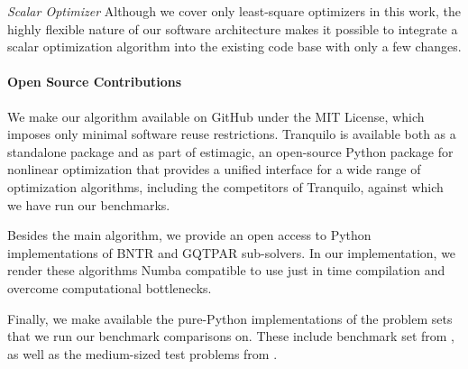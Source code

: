 \textit{Scalar Optimizer} Although we cover only least-square optimizers in this work, the highly flexible nature of our software architecture makes it possible to integrate a scalar optimization algorithm into the existing code base with only a few changes.

\paragraph{Open Source Contributions} We make our algorithm available on GitHub under the MIT License, which imposes only minimal software reuse restrictions. Tranquilo is available both as a standalone package and as part of estimagic, an open-source Python package for nonlinear optimization that provides a unified interface for a wide range of optimization algorithms, including the competitors of Tranquilo, against which we have run our benchmarks.

Besides the main algorithm, we provide an open access to Python implementations of BNTR and GQTPAR sub-solvers. In our implementation, we render these algorithms Numba compatible to use just in time compilation and overcome computational bottlenecks.


Finally, we make available the pure-Python implementations of the problem sets that we run our benchmark comparisons on. These include benchmark set from \citet{Mor2009}, as well as the medium-sized test problems from \citet{Cartis2019}.

